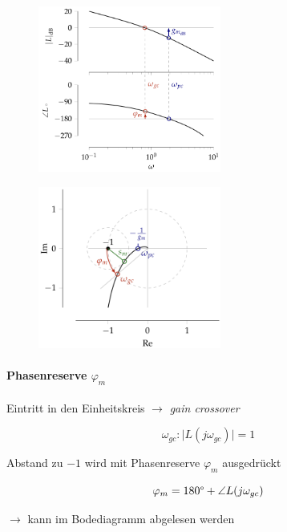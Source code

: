 \documentclass[
  10pt,
  a4paper,
  twocolumn]{article}
\let\oldparagraph\paragraph
\renewcommand{\paragraph}[1]{\oldparagraph{#1}\mbox{}}
\numberwithin{equation}{section}
\let\paragraph\oldparagraph
\renewcommand{\paragraph}[1]{\oldparagraph{#1}\mbox{}\par}
\begin{document}
\begin{figure}[H]

{\centering \includegraphics[width=6cm,height=\textheight]{images/paste-7.png}

}

\end{figure}

\begin{figure}[H]

{\centering \includegraphics[width=6cm,height=\textheight]{images/paste-8.png}

}

\end{figure}

\hypertarget{phasenreserve-varphi_m}{%
\paragraph{\texorpdfstring{Phasenreserve
\(\varphi_m\)}{Phasenreserve \textbackslash varphi\_m}}\label{phasenreserve-varphi_m}}

Eintritt in den Einheitskreis \(\rightarrow\) \emph{gain crossover}

\[
\omega_{gc} : \lvert L(j\omega_{gc})\rvert = 1
\]

Abstand zu \(-1\) wird mit Phasenreserve \(\varphi_m\) ausgedrückt

\[
\varphi_m = 180\degree+\angle L(j\omega_{gc})
\]

\(\rightarrow\) kann im Bodediagramm abgelesen werden
\end{document}
